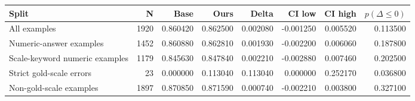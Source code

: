 \begin{tabular}{lrrrrrrr}
\toprule
Split & N & Base & Ours & Delta & CI low & CI high & $p(\Delta \leq 0)$ \\
\midrule
All examples & 1920 & 0.860420 & 0.862500 & 0.002080 & -0.001250 & 0.005520 & 0.113500 \\
Numeric-answer examples & 1452 & 0.860880 & 0.862810 & 0.001930 & -0.002200 & 0.006060 & 0.187800 \\
Scale-keyword numeric examples & 1179 & 0.845630 & 0.847840 & 0.002210 & -0.002880 & 0.007460 & 0.202500 \\
Strict gold-scale errors & 23 & 0.000000 & 0.113040 & 0.113040 & 0.000000 & 0.252170 & 0.036800 \\
Non-gold-scale examples & 1897 & 0.870850 & 0.871590 & 0.000740 & -0.002210 & 0.003800 & 0.327100 \\
\bottomrule
\end{tabular}
